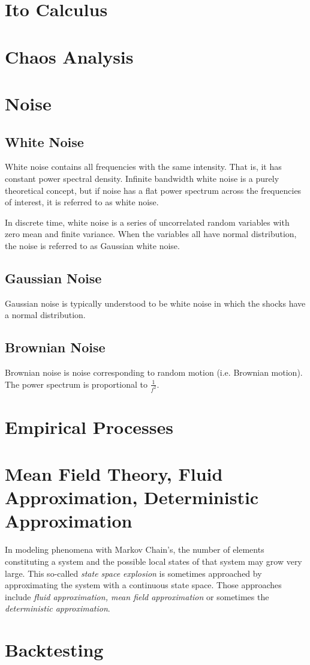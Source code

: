 \section{Ito Calculus}

\section{Chaos Analysis}

\section{Noise}

\subsection{White Noise}
White noise contains all frequencies with the same intensity. That is, it has constant power spectral density. Infinite bandwidth white noise is a purely theoretical concept, but if noise has a flat power spectrum across the frequencies of interest, it is referred to as white noise. 

In discrete time, white noise is a series of uncorrelated random variables with zero mean and finite variance. When the variables all have normal distribution, the noise is referred to as Gaussian white noise. 

\subsection{Gaussian Noise}
Gaussian noise is typically understood to be white noise in which the shocks have a normal distribution.

\subsection{Brownian Noise}
Brownian noise is noise corresponding to random motion (i.e. Brownian motion). The power spectrum is proportional to $\frac{1}{f^2}$.

\section{Empirical Processes}

\section{Mean Field Theory, Fluid Approximation, Deterministic Approximation}
In modeling phenomena with Markov Chain's, the number of elements constituting a system and the possible local states of that system may grow very large. This so-called \textit{state space explosion} is sometimes approached by approximating the system with a continuous state space. Those approaches include \textit{fluid approximation, mean field approximation} or sometimes the \textit{deterministic approximation}. 


\section{Backtesting}
